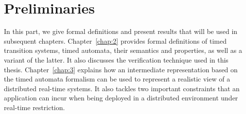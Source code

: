 \documentclass[a4paper,Times,twoside,index,12pt]{Classes/PhDThesisPSnPDF}
\begin{document}
\frontmatter




\begin{titlepage}
  \maketitle
\end{titlepage}

\mainmatter

%
%




\dominitoc
\dominilof
\dominilot
\renewcommand{\baselinestretch}{0.9}\normalsize
\tableofcontents
\renewcommand{\baselinestretch}{1.0}\normalsize





\part{Preliminaries}
{In this part, we give formal definitions and present results that will be used in subsequent
chapters. Chapter~\ref{chap:2} provides formal definitions of timed transition systems,
timed automata, their semantics and properties, as well as a variant of the latter.
It also discusses the verification technique used in this thesis. Chapter~\ref{chap:3}
explains how an intermediate representation based on the timed automata formalism
can be used to represent a realistic view of a distributed real-time systems. It also tackles
two important constraints that an application can incur when being deployed in a distributed
environment under real-time restriction.} 


\end{document}
